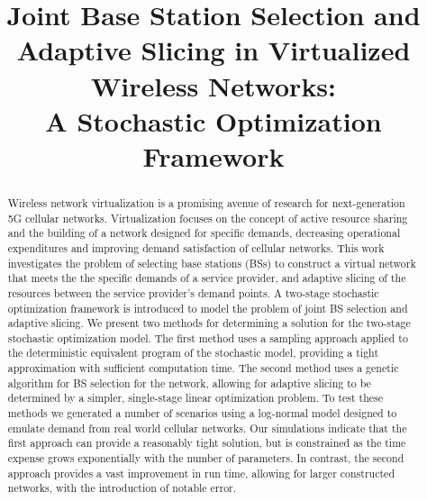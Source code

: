 \documentclass[conference]{IEEEtran}
\begin{document}
%
\title{Joint Base Station Selection and Adaptive Slicing in Virtualized Wireless Networks:\\A Stochastic Optimization Framework}

\author{
}

\maketitle

\begin{abstract}
Wireless network virtualization is a promising avenue of research for next-generation 5G cellular networks.  Virtualization focuses on the concept of active resource sharing and the building of a network designed for specific demands, decreasing operational expenditures and improving demand satisfaction of cellular networks.  This work investigates the problem of selecting base stations (BSs) to construct a virtual network that meets the the specific demands of a service provider, and adaptive slicing of the resources between the service provider's demand points.  A two-stage stochastic optimization framework is introduced to model the problem of joint BS selection and adaptive slicing.  We present two methods for determining a solution for the two-stage stochastic optimization model.  The first method uses a sampling approach applied to the deterministic equivalent program of the stochastic model, providing a tight approximation with sufficient computation time.  The second method uses a genetic algorithm for BS selection for the network, allowing for adaptive slicing to be determined by a simpler, single-stage linear optimization problem.  To test these methods we generated a number of scenarios using a log-normal model designed to emulate demand from real world cellular networks.  Our simulations indicate that the first approach can provide a reasonably tight solution, but is constrained as the time expense grows exponentially with the number of parameters.  In contrast, the second approach provides a vast improvement in run time, allowing for larger constructed networks, with the introduction of notable error.
\end{abstract}
\end{document}
